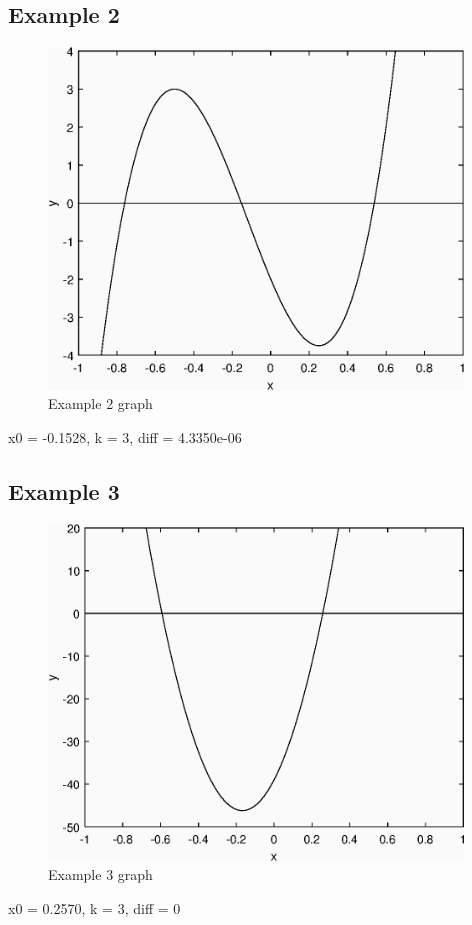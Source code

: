 \documentclass[12pt]{article}
\begin{document}
\subsection{Example 2}
\begin{figure}[!htb]
\centering
\includegraphics[width=110mm]{ex2}
\caption{Example 2 graph}
\end{figure}
x0 = -0.1528,
k = 3,
diff = 4.3350e-06

\subsection{Example 3}
\begin{figure}[!htb]
\centering
\includegraphics[width=110mm]{ex3}
\caption{Example 3 graph}
\end{figure}
x0 = 0.2570,
k = 3,
diff = 0

\end{document}
